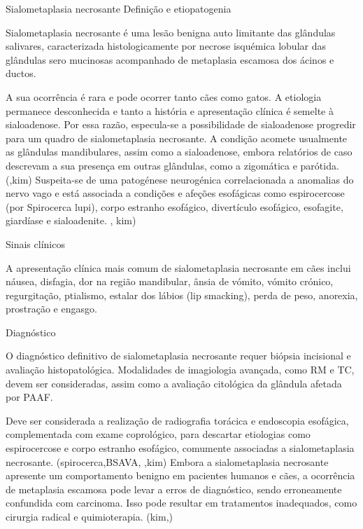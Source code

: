Sialometaplasia necrosante
Definição e etiopatogenia


Sialometaplasia necrosante é uma lesão benigna auto limitante das glândulas salivares, caracterizada histologicamente	por necrose isquémica lobular das glândulas sero mucinosas acompanhado de metaplasia escamosa dos ácinos e ductos. \cite{Mukaratirwa2015,reiter_bsava_2018} 


A sua ocorrência é rara e pode ocorrer tanto cães como gatos. A etiologia permanece desconhecida e tanto a história e apresentação clínica é semel\cite{Han2016}te à sialoadenose. Por essa razão, especula-se a possibilidade de sialoadenose progredir para um quadro de sialometaplasia necrosante. \cite{reiter_bsava_2018} A condição acomete usualmente as glândulas mandibulares, assim como a sialoadenose, embora relatórios de caso descrevam a sua presença em outras glândulas, como a zigomática e parótida. (\cite{perez-ecija_granulomatous_2012},kim) Suspeita-se de uma patogénese neurogénica correlacionada a anomalias do nervo vago  e está associada a condições e afeções esofágicas como espirocercose (por Spirocerca lupi), corpo estranho esofágico, divertículo esofágico, esofagite, giardíase e sialoadenite. \cite{reiter_bsava_2018,schoroeder}, kim)


Sinais clínicos


A apresentação clínica mais comum de sialometaplasia necrosante em cães inclui náusea, disfagia, dor na região mandibular, ânsia de vómito, vómito crónico, regurgitação, ptialismo, estalar dos lábios (lip smacking), perda de peso, anorexia, prostração e engasgo. \cite{Mukaratirwa2015,reiter_bsava_2018} 


Diagnóstico


O diagnóstico definitivo de sialometaplasia necrosante requer biópsia incisional e avaliação histopatológica. Modalidades de imagiologia avançada, como RM e TC, devem ser consideradas, assim como a avaliação citológica da glândula afetada por PAAF. \cite{reiter_bsava_2018}


Deve ser considerada a realização de radiografia torácica e endoscopia esofágica, complementada com exame coprológico, para descartar etiologias como espirocercose e corpo estranho esofágico, comumente associadas a sialometaplasia necrosante. (spirocerca,BSAVA, \cite{schoroeder},kim) Embora a sialometaplasia necrosante apresente um comportamento benigno em pacientes humanos e cães, a ocorrência de metaplasia escamosa pode levar a erros de diagnóstico, sendo erroneamente confundida com carcinoma. Isso pode resultar em tratamentos inadequados, como cirurgia radical e quimioterapia. (kim,\cite{Mukaratirwa2015})


